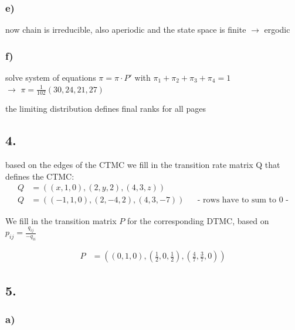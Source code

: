 \subsubsection*{ e) }

now chain is irreducible, also aperiodic and the state space is finite $\rightarrow$ ergodic

\subsubsection*{ f) }
solve system of equations $\pi=\pi\cdot P'$ with  $\pi_{1}+\pi_{2}+\pi_{3}+\pi_{4}=1$\\
$\rightarrow$ $\pi=\frac{1}{102}\left(30,24,21,27\right)$

the limiting distribution defines final ranks for all pages

\subsection*{ 4. }

based on the edges of the CTMC we fill in the transition rate matrix Q that
defines the CTMC:
\begin{align*}
Q&=\left(\left(x,1,0\right),\left(2,y,2\right),\left(4,3,z\right)\right)\\
Q&=\left(\left(-1,1,0\right),\left(2,-4,2\right),\left(4,3,-7\right)\right)&& \text{-  rows have to sum to 0 -}
\end{align*}

We fill in the transition matrix $P$ for the corresponding DTMC, based on
$p_{{ij}}=\frac{q_{{ij}}}{-q_{{ii}}}$

\begin{align*}
P&=\left(\left(0,1,0\right),\left(\frac{1}{2},0,\frac{1}{2}\right),\left(\frac{4}{7},\frac{3}{7},0\right)\right)
\end{align*}

\subsection*{ 5. }

\subsubsection*{ a) }

